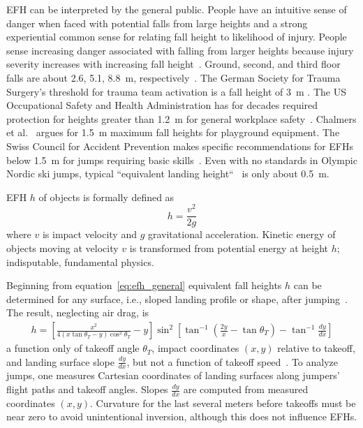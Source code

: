 \documentclass[smallextended]{svjour3}       %
\begin{document}
EFH can be interpreted by the general public. People have an intuitive sense of
danger when faced with potential falls from large heights and a strong
experiential common sense for relating fall height to likelihood of injury. 
People sense increasing danger associated with falling from larger heights because injury severity increases with increasing fall height~\cite{Nau2021}.
Ground, second, and third floor falls are about 2.6, 5.1, 8.8~\si{\meter},
respectively~\cite{Vish2005}. The German Society for Trauma Surgery's threshold for trauma team activation is a fall height of 3~\si{\meter} \cite{PolytraumaGuidelineUpdateGroup2018}. The US Occupational Safety and Health
Administration has for decades required protection for heights greater than 1.2~\si{\meter} for
general workplace safety~\cite{OSHA2021}.  Chalmers et al.~\cite{Chalmers1996}
argues for 1.5~\si{\meter} maximum fall heights for playground equipment. The
Swiss Council for Accident Prevention makes specific recommendations for EFHs
below 1.5~\si{\meter} for jumps requiring basic skills~\cite{Heer2019}.
Even with no standards in Olympic Nordic ski jumps, typical ``equivalent
landing height``~\cite{Gasser2018} is only about 0.5~\si{\meter}.

EFH $h$ of objects is formally defined as
%
\begin{equation}
  h = \frac{v^2}{2g}
  \label{eq:efh_general}
\end{equation}
%
where $v$ is impact velocity and $g$ gravitational acceleration.  Kinetic
energy of objects moving at  velocity $v$  is transformed from potential energy
at height $h$; indisputable, fundamental physics.

Beginning from equation~\ref{eq:efh_general} equivalent fall heights $h$ can be
determined for any surface, i.e., sloped landing profile or shape, after
jumping~\cite{Petrone2017}. The result, neglecting air drag, is
%
\begin{align}
  h = \left[\frac{x^2}{4(x\tan\theta_T - y)\cos^{2}\theta_T} - y\right]
    \sin^{2}
    \left[\tan^{-1}\left(\frac{2y}{x} - \tan\theta_T\right) -
    \tan^{-1}\frac{dy}{dx}\right]
  \label{eq:efh}
\end{align}
%
a function only of takeoff angle $\theta_T$, impact coordinates $(x,y)$
relative to takeoff, and landing surface slope $\frac{dy}{dx}$, but not a
function of takeoff speed~\cite{Petrone2017}. To analyze jumps, one measures
Cartesian coordinates of landing surfaces along jumpers' flight paths and
takeoff angles. Slopes $\frac{dy}{dx}$ are computed from measured coordinates
$(x,y)$. Curvature for the last several meters before takeoffs must be near
zero to avoid unintentional inversion, although this does not influence EFHs.
\end{document}
